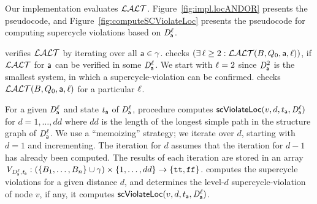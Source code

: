 Our implementation evaluates $\mathcal{LALT}$.
Figure~\ref{fig:impl.locANDOR}  presents the pseudocode, and 
Figure~\ref{fig:computeSCViolateLoc} presents the pseudocode for
computing supercycle violations based on $\mathit{D}_{\mathsf{a}}^{\ell}$.

 verifies $\mathcal{LALT}$ by iterating over all $\mathsf{a} \in \gamma$. 
 checks $(\exists\, \ell \ge 2: \mathcal{LALT}(B, Q_0, \mathsf{a}, \ell))$, \ie if $\mathcal{LALT}$ for $\mathsf{a}$ can be verified
in some  $\mathit{D}_{\mathsf{a}}^{\ell}$. We start with $\ell=2$ since $\mathit{D}_{\mathsf{a}}^{2}$ is the smallest system, in which a
supercycle-violation can be confirmed. 
 checks $\mathcal{LALT}(B, Q_0, \mathsf{a}, \ell)$ for a particular $\ell$. 

For a given $\mathit{D}_{\mathsf{a}}^{\ell}$ and state $t_{\mathsf{a}}$ of $\mathit{D}_{\mathsf{a}}^{\ell}$, procedure  computes
$\mathsf{scViolateLoc}(v,d,t_{\mathsf{a}},\mathit{D}_{\mathsf{a}}^{\ell})$ for $d = 1,\ldots,dd$ where $dd$ is
the length of the longest simple path in the structure graph of $\mathit{D}_{\mathsf{a}}^{\ell}$.
We use a ``memoizing'' strategy; we iterate over $d$, starting with $d=1$ and incrementing.  The iteration for $d$ assumes that
the iteration for $d-1$ has already been computed.  The results of each iteration are stored in an array
$\mathit{V_{\mathit{D}_{\mathsf{a}}^{\ell},t_{\mathsf{a}}}}: (\{ B_1,\ldots,B_n \} \cup \gamma) \times \{ 1,\ldots,dd \} \to \{ \textup{\texttt{tt}},\textup{\texttt{ff}} \}$.
%
%
 computes the supercycle violations for a given distance $d$, and
 determines the level-$d$ supercycle-violation of node $v$, if any, \ie it computes 
$\mathsf{scViolateLoc}(v,d,t_{\mathsf{a}},\mathit{D}_{\mathsf{a}}^{\ell})$.





